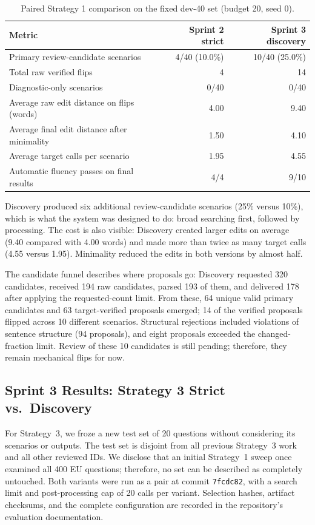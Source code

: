 \documentclass[11pt,a4paper]{article}
\begin{document}
\begin{table}[htbp]
\centering
\small
\begin{tabularx}{\textwidth}{@{}Y r r@{}}
\toprule
\textbf{Metric} & \textbf{Sprint 2 strict} & \textbf{Sprint 3 discovery} \\
\midrule
Primary review-candidate scenarios & 4/40 (10.0\%) & 10/40 (25.0\%) \\
Total raw verified flips & 4 & 14 \\
Diagnostic-only scenarios & 0/40 & 0/40 \\
Average raw edit distance on flips (words) & 4.00 & 9.40 \\
Average final edit distance after minimality & 1.50 & 4.10 \\
Average target calls per scenario & 1.95 & 4.55 \\
Automatic fluency passes on final results & 4/4 & 9/10 \\
\bottomrule
\end{tabularx}
\caption{Paired Strategy 1 comparison on the fixed dev-40 set (budget 20, seed 0).}
\label{tab:s1}
\end{table}

Discovery produced six additional review-candidate scenarios (25\% versus 10\%),
which is what the system was designed to do: broad searching first, followed by
processing. The cost is also visible: Discovery created larger edits on average
(9.40 compared with 4.00 words) and made more than twice as many target calls
(4.55 versus 1.95). Minimality reduced the edits in both versions by almost half.

The candidate funnel describes where proposals go: Discovery requested 320
candidates, received 194 raw candidates, parsed 193 of them, and delivered 178 after
applying the requested-count limit. From these, 64 unique valid primary candidates
and 63 target-verified proposals emerged; 14 of the verified proposals flipped across
10 different scenarios. Structural rejections included violations of sentence
structure (94 proposals), and eight proposals exceeded the changed-fraction limit.
Review of these 10 candidates is still pending; therefore, they remain mechanical
flips for now.

\subsection{Sprint 3 Results: Strategy 3 Strict vs.\ Discovery}
\label{sec:s3results}

For Strategy~3, we froze a new test set of 20 questions without considering its
scenarios or outputs. The test set is disjoint from all previous Strategy~3 work and
all other reviewed IDs. We disclose that an initial Strategy~1 sweep once examined all
400 EU questions; therefore, no set can be described as completely untouched. Both
variants were run as a pair at commit \texttt{7fcdc82}, with a search limit and
post-processing cap of 20 calls per variant. Selection hashes, artifact checksums, and
the complete configuration are recorded in the repository's evaluation documentation.
\end{document}
